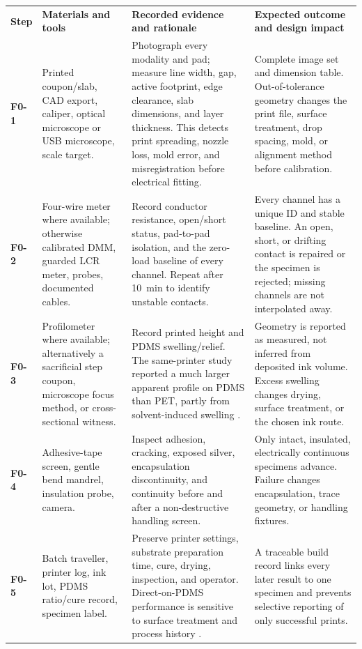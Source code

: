\begingroup
\fontsize{7.8}{9.15}\selectfont
\setlength{\tabcolsep}{2.7pt}\renewcommand{\arraystretch}{1.07}
\begin{tabularx}{\linewidth}{>{\raggedright\arraybackslash\bfseries\color{AUBRed}}p{1.05cm}Y Y Y}
\color{white}\textbf{Step} & \color{white}\textbf{Materials and tools} &
\color{white}\textbf{Recorded evidence and rationale} &
\color{white}\textbf{Expected outcome and design impact} \\
F0-1 & Printed coupon/slab, CAD export, caliper, optical microscope or USB
microscope, scale target. & Photograph every modality and pad; measure line
width, gap, active footprint, edge clearance, slab dimensions, and layer
thickness. This detects print spreading, nozzle loss, mold error, and
misregistration before electrical fitting. & Complete image set and dimension
table. Out-of-tolerance geometry changes the print file, surface treatment,
drop spacing, mold, or alignment method before calibration. \\
F0-2 & Four-wire meter where available; otherwise calibrated DMM, guarded LCR
meter, probes, documented cables. & Record conductor resistance, open/short
status, pad-to-pad isolation, and the zero-load baseline of every channel.
Repeat after 10~min to identify unstable contacts. & Every channel has a unique
ID and stable baseline. An open, short, or drifting contact is repaired or the
specimen is rejected; missing channels are not interpolated away. \\
F0-3 & Profilometer where available; alternatively a sacrificial step coupon,
microscope focus method, or cross-sectional witness. & Record printed height
and PDMS swelling/relief. The same-printer study reported a much larger
apparent profile on PDMS than PET, partly from solvent-induced swelling
\cite{albrecht2018stretch}. & Geometry is reported as measured, not inferred
from deposited ink volume. Excess swelling changes drying, surface treatment,
or the chosen ink route. \\
F0-4 & Adhesive-tape screen, gentle bend mandrel, insulation probe, camera. &
Inspect adhesion, cracking, exposed silver, encapsulation discontinuity, and
continuity before and after a non-destructive handling screen. & Only intact,
insulated, electrically continuous specimens advance. Failure changes
encapsulation, trace geometry, or handling fixtures. \\
F0-5 & Batch traveller, printer log, ink lot, PDMS ratio/cure record, specimen
label. & Preserve printer settings, substrate preparation time, cure, drying,
inspection, and operator. Direct-on-PDMS performance is sensitive to surface
treatment and process history \cite{q4abukhalaf2018,q4abukhalaf2019}. & A
traceable build record links every later result to one specimen and prevents
selective reporting of only successful prints. \\
\end{tabularx}
\endgroup

